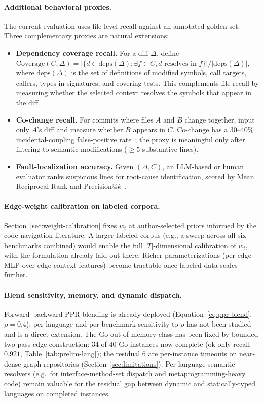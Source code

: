 \documentclass[11pt, a4paper]{article}
\begin{document}
\paragraph{Additional behavioral proxies.} The current evaluation uses file-level recall against an annotated golden set. Three complementary proxies are natural extensions:
\begin{itemize}
    \item \textbf{Dependency coverage recall.} For a diff $\Delta$, define $\mathrm{Coverage}(C, \Delta) = |\{d \in \mathrm{deps}(\Delta) : \exists f \in C, d \text{ resolves in } f\}| / |\mathrm{deps}(\Delta)|$, where $\mathrm{deps}(\Delta)$ is the set of definitions of modified symbols, call targets, callers, types in signatures, and covering tests. This complements file recall by measuring whether the selected context resolves the symbols that appear in the diff~\cite{parnin2011automated}.
    \item \textbf{Co-change recall.} For commits where files $A$ and $B$ change together, input only $A$'s diff and measure whether $B$ appears in $C$. Co-change has a 30--40\% incidental-coupling false-positive rate~\cite{hassan2004predicting}; the proxy is meaningful only after filtering to semantic modifications ($\geq 5$ substantive lines).
    \item \textbf{Fault-localization accuracy.} Given $(\Delta, C)$, an LLM-based or human evaluator ranks suspicious lines for root-cause identification, scored by Mean Reciprocal Rank and Precision@$k$~\cite{parnin2011automated}.
\end{itemize}

\paragraph{Edge-weight calibration on labeled corpora.} Section~\ref{sec:weight-calibration} fixes $w_t$ at author-selected priors informed by the code-navigation literature. A larger labeled corpus (e.g., a sweep across all six benchmarks combined) would enable the full $|T|$-dimensional calibration of $w_t$, with the formulation already laid out there. Richer parameterizations (per-edge MLP over edge-context features) become tractable once labeled data scales further.

\paragraph{Blend sensitivity, memory, and dynamic dispatch.} Forward--backward PPR blending is already deployed (Equation~\ref{eq:ppr-blend}, $\rho = 0.4$); per-language and per-benchmark sensitivity to $\rho$ has not been studied and is a direct extension. The Go out-of-memory class has been fixed by bounded two-pass edge construction: 34 of 40 Go instances now complete (ok-only recall $0.921$, Table~\ref{tab:prelim-lang}); the residual 6 are per-instance timeouts on near-dense-graph repositories (Section~\ref{sec:limitations}). Per-language semantic resolvers (e.g.\ for interface-method-set dispatch and metaprogramming-heavy code) remain valuable for the residual gap between dynamic and statically-typed languages on completed instances.
\end{document}
